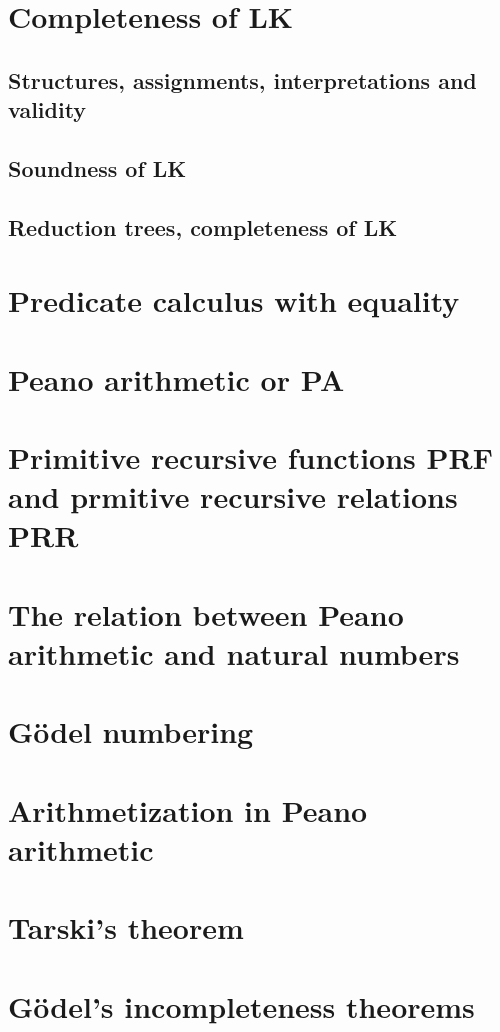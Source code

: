\documentclass[11pt,a4paper]{article}
\begin{document}
\section{Completeness of LK}

\subsection{Structures, assignments, interpretations and validity}

\subsection{Soundness of LK}

\subsection{Reduction trees, completeness of LK}

\section{Predicate calculus with equality}

\section{Peano arithmetic or PA}

\section{Primitive recursive functions PRF and prmitive recursive relations PRR}

\section{The relation between Peano arithmetic and natural numbers}

\section{Gödel numbering}

\section{Arithmetization in Peano arithmetic}

\section{Tarski's theorem}

\section{Gödel's incompleteness theorems}
\end{document}
